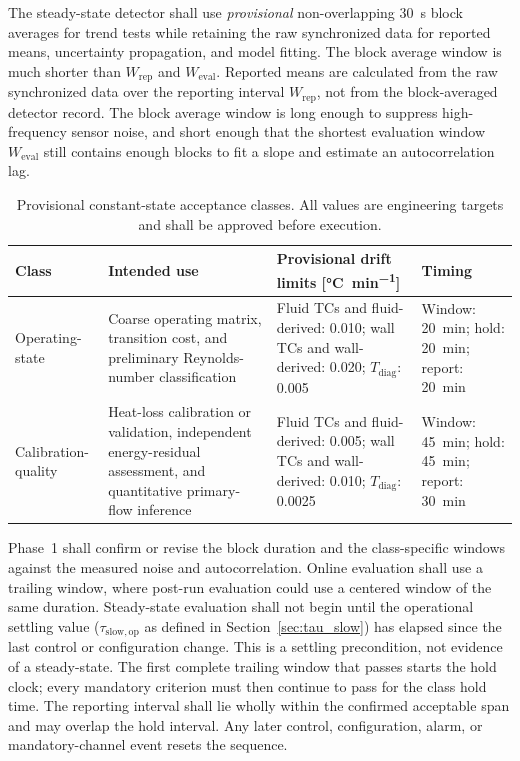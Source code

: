 \documentclass[11pt]{article}
\newcommand{\Tdiag}{T_{\mathrm{diag}}}
\begin{document}
The steady-state detector shall use \emph{provisional} non-overlapping \SI{30}{s} block averages for trend tests while retaining the raw synchronized data for reported means, uncertainty propagation, and model fitting. The block average window is much shorter than $W_{\mathrm{rep}}$ and $W_{\mathrm{eval}}$. Reported means are calculated from the raw synchronized data over the reporting interval $W_{\mathrm{rep}}$, not from the block-averaged detector record. The block average window is long enough to suppress high-frequency sensor noise, and short enough that the shortest evaluation window $W_{\mathrm{eval}}$ still contains enough blocks to fit a slope and estimate an autocorrelation lag. 

\begin{table}[H]
\centering
\caption{Provisional constant-state acceptance classes. All values are engineering targets and shall be approved before execution.}
\label{tab:ss_classes}
{\small
\setlength{\tabcolsep}{4.5pt}
\begin{tabularx}{\textwidth}{@{}>{\raggedright\arraybackslash}p{0.98in}>{\raggedright\arraybackslash}X>{\raggedright\arraybackslash}p{1.42in}>{\raggedright\arraybackslash}p{1.30in}@{}}
\toprule
\textbf{Class} & \textbf{Intended use} & \textbf{Provisional drift limits [\si{\degreeCelsius\per min}]} & \textbf{Timing} \\
\midrule
Operating-state & Coarse operating matrix, transition cost, and preliminary Reynolds-number classification & Fluid TCs and fluid-derived: \num{0.010}; wall TCs and wall-derived: \num{0.020}; $\Tdiag$: \num{0.005} & Window: \SI{20}{min}; hold: \SI{20}{min}; report: \SI{20}{min} \\
\addlinespace
Calibration-quality & Heat-loss calibration or validation, independent energy-residual assessment, and quantitative primary-flow inference & Fluid TCs and fluid-derived: \num{0.005}; wall TCs and wall-derived: \num{0.010}; $\Tdiag$: \num{0.0025} & Window: \SI{45}{min}; hold: \SI{45}{min}; report: \SI{30}{min} \\
\bottomrule
\end{tabularx}}
\end{table}

Phase~1 shall confirm or revise the block duration and the class-specific windows against the measured noise and autocorrelation. Online evaluation shall use a trailing window, where post-run evaluation could use a centered window of the same duration. Steady-state evaluation shall not begin until the operational settling value ($\tau_{\mathrm{slow,op}}$ as defined in Section~\ref{sec:tau_slow}) has elapsed since the last control or configuration change. This is a settling precondition, not evidence of a steady-state. The first complete trailing window that passes starts the hold clock; every mandatory criterion must then continue to pass for the class hold time. The reporting interval shall lie wholly within the confirmed acceptable span and may overlap the hold interval. Any later control, configuration, alarm, or mandatory-channel event resets the sequence.
\end{document}
